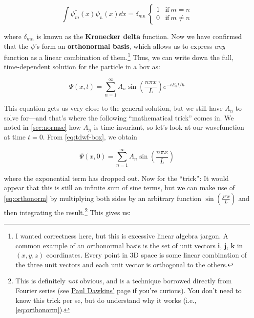\begin{tcolorbox}[title = Orthonormal stationary states] \vspace{-2ex}
	\begin{equation}
		\int \psi_m^*(x) \psi_n(x) \dd{x} = \delta_{mn}\ \begin{cases}
		1 & \text{if}\ m=n \\
		0 & \text{if}\ m\neq n
		\end{cases} \label{eq:orthonorm}
	\end{equation}
\end{tcolorbox}

\noindent where $\delta_{mn}$ is known as the \textbf{Kronecker delta} function. 
Now we have confirmed that the $\psi$'s form an \textbf{orthonormal basis}, which allows us to express \emph{any} function as a linear combination of them.\footnote{I wanted correctness here, but this is excessive linear algebra jargon. A common example of an orthonormal basis is the set of unit vectors $\mathbf{i}$, $\mathbf{j}$, $\mathbf{k}$ in $(x,y,z)$ coordinates. Every point in 3D space is some linear combination of the three unit vectors and each unit vector is orthogonal to the others.} 
Thus, we can write down the full, time-dependent solution for the particle in a box as:

\begin{equation}
	\Psi(x,t) = \sum_{n=1}^{\infty} A_n \sin \left(\frac{n\pi x}{L}\right) e^{-iE_nt/\hbar} \label{eq:tdwf-box}
\end{equation}

This equation gets us very close to the general solution, but we still have $A_n$ to solve for---and that's where the following ``mathematical trick'' comes in. 
We noted in \autoref{sec:normse} how $A_n$ is time-invariant, so let's look at our wavefunction at time $t = 0$. 
From \autoref{eq:tdwf-box}, we obtain

\begin{equation*}
	\Psi(x,0) = \sum_{n=1}^{\infty} A_n \sin \left(\frac{n\pi x}{L} \right)
\end{equation*}

\noindent where the exponential term has dropped out. 
Now for the ``trick'': It would appear that this is still an infinite sum of sine terms, but we can make use of \autoref{eq:orthonorm} by multiplying both sides by an arbitrary function $\sin \left(\frac{j\pi x}{L}\right)$ and then integrating the result.\footnote{This is definitely \emph{not} obvious, and is a technique borrowed directly from Fourier series (see \href{http://tutorial.math.lamar.edu/Classes/DE/FourierSeries.aspx}{Paul Dawkins'} page if you're curious). You don't need to know this trick per se, but do understand why it works (i.e., \autoref{eq:orthonorm}).} 
This gives us:

